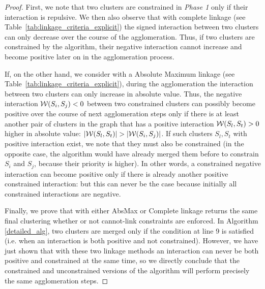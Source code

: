 \begin{proof}
First, we note that two clusters are constrained in \emph{Phase 1} only if their interaction is repulsive. We then also observe that with complete linkage (see Table~\ref{tab:linkage_criteria_explicit}) the signed interaction between two clusters can only decrease over the course of the agglomeration. Thus, if two clusters are constrained by the algorithm, their negative interaction cannot increase and become positive later on in the agglomeration process.

If, on the other hand, we consider \algname{} with a Absolute Maximum linkage (see Table~\ref{tab:linkage_criteria_explicit}), during the agglomeration the interaction between two clusters can only increase in absolute value. Thus, the negative interaction $\mathcal{W}{}(S_i,S_j)<0$ between two constrained clusters can possibly become positive over the course of next agglomeration steps only if there is at least another pair of clusters in the graph that has a positive interaction $\mathcal{W}{}(S_l,S_t)>0$ higher in absolute value: $|\mathcal{W}{}(S_l,S_t)| > |\mathcal{W}{}(S_i,S_j)|$.
If such clusters $S_l, S_t$ with positive interaction exist, we note that they must also be constrained (in the opposite case, the algorithm would have already merged them before to constrain $S_i$ and $S_j$, because their priority is higher). In other words, a constrained negative interaction can become positive only if there is already another positive constrained interaction: but this can never be the case because initially all constrained interactions are negative.

Finally, we prove that \algname{} with either AbsMax or Complete linkage returns the same final clustering whether or not cannot-link constraints are enforced. In Algorithm \ref{detailed_alg}, two clusters are merged only if the condition at line 9 is satisfied (i.e. when an interaction is both positive and not constrained). However, we have just shown that with these two linkage methods an interaction can never be both positive and constrained at the same time, so we directly conclude that the constrained and unconstrained versions of the algorithm will perform precisely the same agglomeration steps.
\end{proof}


\absmaxmutex*

